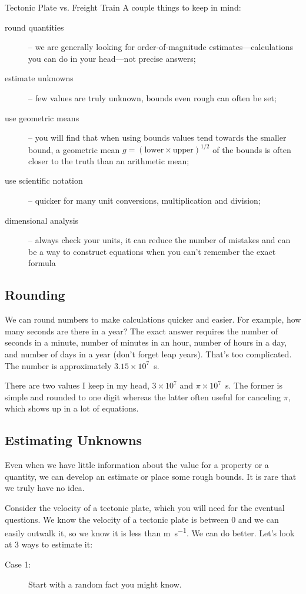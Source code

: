 \begin{activity}{Tectonic Plate vs. Freight Train}
A couple things to keep in mind:
\begin{description}
    \item [round quantities] -- we are generally looking for order-of-magnitude estimates---calculations you can do in your head---not precise answers;
    \item [estimate unknowns] -- few values are truly unknown, bounds even rough can often be set;
    \item [use geometric means] -- you will find that when using bounds values tend towards the smaller bound, a geometric mean $g = (\text{lower} \times \text{upper})^{1/2}$ of the bounds is often closer to the truth than an arithmetic mean;
    \item [use scientific notation] -- quicker for many unit conversions, multiplication and division;
    \item [dimensional analysis] -- always check your units, it can reduce the number of mistakes and can be a way to construct equations when you can't remember the exact formula
\end{description}

\subsection{Rounding}
We can round numbers to make calculations quicker and easier.  For example, how many seconds are there in a year?  The exact answer requires the number of seconds in a minute, number of minutes in an hour, number of hours in a day, and number of days in a year (don't forget leap years).  That's too complicated.  The number is approximately $3.15\times10^{7}$~\si{s}.

There are two values I keep in my head, $3\times10^{7}$ and $\pi \times 10^{7}$~\si{s}.  The former is simple and rounded to one digit whereas the latter often useful for canceling $\pi$, which shows up in a lot of equations.

\subsection{Estimating Unknowns}
Even when we have little information about the value for a property or a quantity, we can develop an estimate or place some rough bounds.  It is rare that we truly have no idea.

Consider the velocity of a tectonic plate, which you will need for the eventual questions.  We know the velocity of a tectonic plate is between 0 and we can easily outwalk it, so we know it is less than \si{m.s^{-1}}.  We can do better.  Let's look at 3 ways to estimate it:
\begin{description}
    \item[Case 1:] Start with a random fact you might know.
    

\end{description}
\end{activity}
